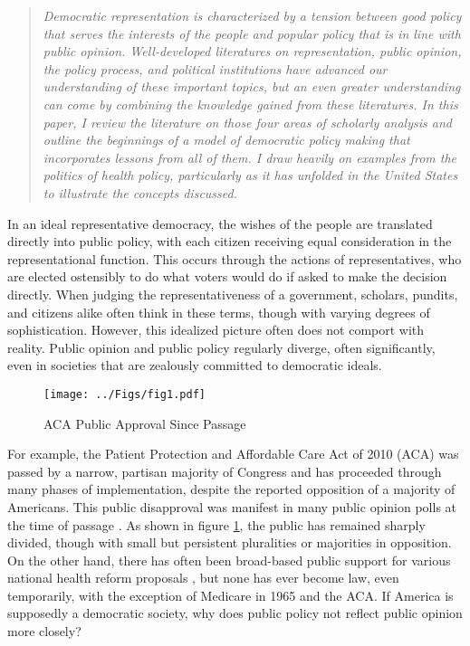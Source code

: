 




\maketitle

\begin{abstract}
\noindent \textit{Democratic representation is characterized by a tension between good policy that serves the interests of the people and popular policy that is in line with public opinion. Well-developed literatures on representation, public opinion, the policy process, and political institutions have advanced our understanding of these important topics, but an even greater understanding can come by combining the knowledge gained from these literatures. In this paper, I review the literature on those four areas of scholarly analysis and outline the beginnings of a model of democratic policy making that incorporates lessons from all of them. I draw heavily on examples from the politics of health policy, particularly as it has unfolded in the United States to illustrate the concepts discussed.}
\end{abstract}

\doublespacing

In an ideal representative democracy, the wishes of the people are translated directly into public policy, with each citizen receiving equal consideration in the representational function. This occurs through the actions of representatives, who are elected ostensibly to do what voters would do if asked to make the decision directly. When judging the representativeness of a government, scholars, pundits, and citizens alike often think in these terms, though with varying degrees of sophistication. However, this idealized picture often does not comport with reality. Public opinion and public policy regularly diverge, often significantly, even in societies that are zealously committed to democratic ideals.

\begin{figure}[tb]
	\caption{ACA Public Approval Since Passage}
	\texttt{[image: ../Figs/fig1.pdf]}
	\label{fig:1}
\end{figure}

For example, the Patient Protection and Affordable Care Act of 2010 (ACA) was passed by a narrow, partisan majority of Congress and has proceeded through many phases of implementation, despite the reported opposition of a majority of Americans. This public disapproval was manifest in many public opinion polls at the time of passage \citep{Blendon2010b}. As shown in figure \ref{fig:1}, the public has remained sharply divided, though with small but persistent pluralities or majorities in opposition. On the other hand, there has often been broad-based public support for various national health reform proposals \citep{Starr1982, Starr2011}, but none has ever become law, even temporarily, with the exception of Medicare in 1965 and the ACA. If America is supposedly a democratic society, why does public policy not reflect public opinion more closely?

